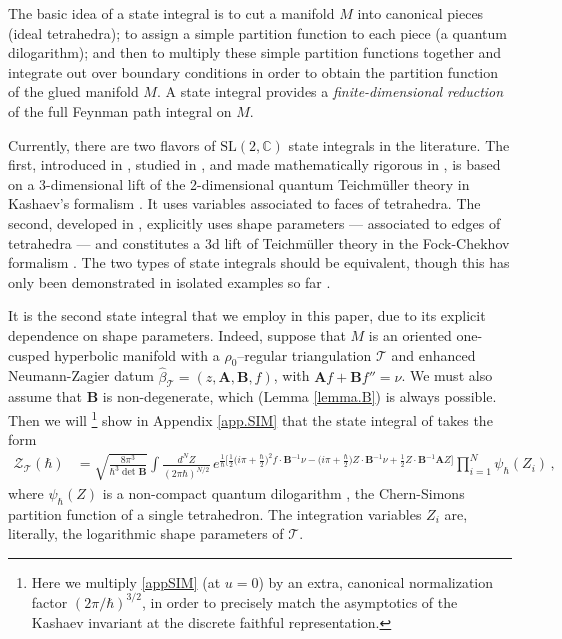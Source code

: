 \documentclass[12pt]{amsart}
\newcommand{\lbl}{\label}
\renewcommand{\eta}{\nu}
\theoremstyle{definition}
\def\SL{\mathrm{SL}}
\def\hb{\hbar}
\newcommand{\CZ}{\mathcal{Z}}
\newcommand{\CT}{\mathcal{T}}
\newcommand{\C}{\mathbb{C}}
\newcommand{\mb}{\mathbf}
\numberwithin{equation}{section}
\begin{document}
The basic idea of a state integral is to cut a 
manifold $M$ into canonical pieces (ideal tetrahedra); to assign a simple 
partition function to each piece (a quantum dilogarithm); and then to 
multiply these simple partition functions together and integrate out over 
boundary conditions in order to obtain the partition function of the glued 
manifold $M$. A state integral provides a \emph{finite-dimensional reduction} 
of the full Feynman path integral on $M$.

Currently, there are two flavors of $\SL(2,\C)$ state integrals in the 
literature. The first, introduced in \cite{Hi,Hi2}, studied in \cite{DGLZ}, 
and made mathematically rigorous in \cite{AK}, is based on a 3-dimensional
lift of the 2-dimensional quantum Teichm\"uller theory in 
Kashaev's formalism \cite{Kashaev-Teich}. It uses variables associated to 
faces of tetrahedra.
%
The second, developed in \cite{D1}, explicitly uses shape parameters --- 
associated to edges of tetrahedra --- and constitutes a 3d lift of 
Teichm\"uller theory in the Fock-Chekhov formalism \cite{FC-Teich}. The 
two types of state integrals should be equivalent, though this has only 
been demonstrated in isolated examples so far \cite{SpirVar}.


It is the second state integral that we employ in this paper, due to its explicit dependence on shape parameters. Indeed, suppose that $M$ is an oriented one-cusped hyperbolic manifold with a $\rho_0$--regular triangulation $\CT$ and enhanced Neumann-Zagier datum $\widehat \beta_\CT=(z,\mb A,\mb B,f)$, with $\mb Af+\mb Bf''=\nu$. We must also assume that $\mb B$ is non-degenerate, which (Lemma \ref{lemma.B}) is always possible. Then we will%
%
\footnote{Here we multiply \eqref{appSIM} (at $u=0$) by an extra, canonical normalization factor $(2\pi/\hbar)^{3/2}$, in order to precisely match the asymptotics of the Kashaev invariant at the discrete faithful representation.} %
%
show in Appendix \ref{app.SIM} that the state integral of \cite{D1} takes the form
%
\begin{align} 
\lbl{SIM}
\CZ_{\CT}(\hbar) &= \sqrt{\frac{8\pi^3}{\hbar^3\det\mb B}}\int 
\frac{d^N\!Z}{(2\pi\hbar)^{N/2}}\,
e^{\tfrac1\hbar\big[ 
\tfrac1{2}\big(i\pi+\tfrac\hbar 2\big)^2f\cdot \mb B^{-1}\eta
-\big(i\pi+\tfrac\hbar2\big)Z\cdot\mb B^{-1}\eta
+\tfrac1{2}Z\cdot\mb{B}^{-1}\mb A Z\big]}
\prod_{i=1}^N \psi_{\hb}(Z_i)\,,  
\end{align}
%
where $\psi_\hbar(Z)$ is a non-compact quantum dilogarithm \cite{Ba, Fa}, the Chern-Simons partition function of a single tetrahedron. The integration variables $Z_i$ are, literally, the logarithmic shape parameters of $\CT$.
\end{document}
